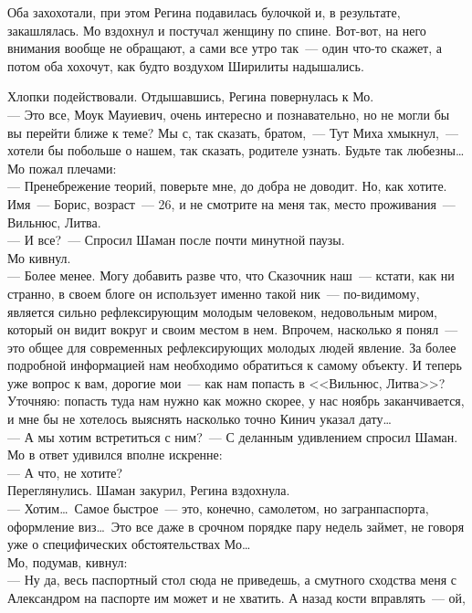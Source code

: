 Оба захохотали, при этом Регина подавилась булочкой и, в результате, 
закашлялась. Мо вздохнул и постучал женщину по спине. Вот-вот, на него внимания 
вообще не обращают, а сами все утро так~--- один что-то скажет, а потом оба 
хохочут, как будто воздухом Ширилиты надышались.

Хлопки подействовали. Отдышавшись, Регина повернулась к Мо.\\
--- Это все, Моук Мауиевич, очень интересно и познавательно, но не могли бы вы 
перейти ближе к теме? Мы с, так сказать, братом,~--- Тут Миха хмыкнул,~--- 
хотели бы побольше о нашем, так сказать, родителе узнать. Будьте так любезны\ldots\\
Мо пожал плечами:\\
--- Пренебрежение теорий, поверьте мне, до добра не доводит. Но, как хотите. 
Имя~--- Борис, возраст~--- 26, и не смотрите на меня так, место проживания~--- Вильнюс, 
Литва.\\
--- И все?~--- Спросил Шаман после почти минутной паузы.\\
Мо кивнул.\\
--- Более менее. Могу добавить разве что, что Сказочник наш~--- кстати, как ни 
странно, в своем блоге он использует именно такой ник~--- по-видимому, является 
сильно рефлексирующим молодым человеком, недовольным миром, который он видит 
вокруг и своим местом в нем. Впрочем, насколько я понял~--- это общее для 
современных рефлексирующих молодых людей явление. За более подробной 
информацией нам необходимо обратиться к самому объекту. И теперь уже вопрос к вам, дорогие 
мои~--- как нам попасть в <<Вильнюс, Литва>>? Уточняю: попасть туда нам нужно 
как можно скорее, у нас ноябрь заканчивается, и мне бы не хотелось выяснять 
насколько точно Кинич указал дату\ldots\\
--- А мы хотим встретиться с ним?~--- С деланным удивлением спросил Шаман. Мо в 
ответ удивился вполне искренне:\\
--- А что, не хотите?\\
Переглянулись. Шаман закурил, Регина вздохнула.\\
--- Хотим\ldots\ Самое быстрое~--- это, конечно, самолетом, но загранпаспорта, 
оформление виз\ldots\ Это все даже в срочном порядке пару недель займет, не 
говоря уже о специфических обстоятельствах Мо\ldots\\
Мо, подумав, кивнул:\\
--- Ну да, весь паспортный стол сюда не приведешь, а смутного сходства меня с 
Александром на паспорте им может и не хватить. А назад кости вправлять~--- ой, 
